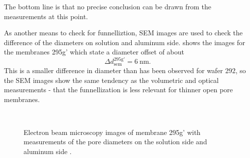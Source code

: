 \documentclass[../thesis.tex]{subfiles}
\begin{document}
    The bottom line is that no precise conclusion can be drawn from the measurements at this point.
    \medskip

    As another means to check for funnelliztion, SEM images are used to check the difference of the diameters on solution and aluminum side.  shows the images for the membranes 295g' which state a diameter offset of about
    \begin{equation*}
        \Delta d_\mathrm{sem}^\mathrm{295g'}=\SI{6}{\nano\meter}.
    \end{equation*}
    This is a smaller difference in diameter than has been observed for wafer 292, so the SEM images show the same tendency as the volumetric and optical measurements - that the funnellization is less relevant for thinner open pore membranes.
    \medskip

    \begin{figure}[p]
      \centering
      \\
      \caption{Electron beam microscopy images of membrane 295g' with measurements of the pore diameters on the solution side \protect{} and aluminum side \protect{}.}
      \label{fig:meb-funnelling}
    \end{figure}
\end{document}
